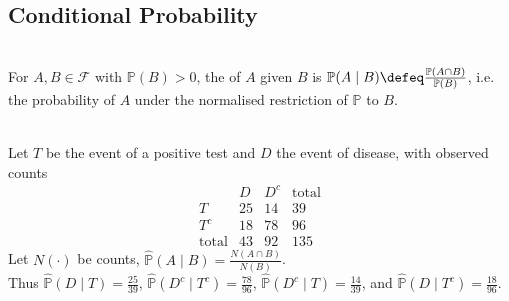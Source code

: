 \subsection{Conditional Probability}

\begin{definition} \label{def:conditional-probability-on-event} \\
For $A,B\in\mathcal{F}$ with $\mathbb{P}(B)>0$, the  of $A$ given $B$ is $\mathbb{P}(A\mid B)\defeq\frac{\mathbb{P}(A\cap B)}{\mathbb{P}(B)}$, i.e. the probability of $A$ under the normalised restriction of $\mathbb{P}$ to $B$.
\end{definition}

\begin{example} \label{ex:diagnostic-table-conditional-probabilities} \\
Let $T$ be the event of a positive test and $D$ the event of disease, with observed counts
\[
\begin{array}{c|cc|c}
&D&D^c&\text{total}\\ \hline
T&25&14&39\\
T^c&18&78&96\\ \hline
\text{total}&43&92&135
\end{array}
\]
Let $N(\cdot)$ be counts, $\widehat{\mathbb{P}}(A\mid B)=\frac{N(A\cap B)}{N(B)}$.\\
Thus $\widehat{\mathbb{P}}(D\mid T)=\frac{25}{39}$, $\widehat{\mathbb{P}}(D^c\mid T^c)=\frac{78}{96}$, $\widehat{\mathbb{P}}(D^c\mid T)=\frac{14}{39}$, and $\widehat{\mathbb{P}}(D\mid T^c)=\frac{18}{96}$.
\end{example}

